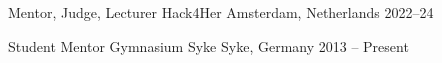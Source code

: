 
\begin{cvhonors}

  \cvhonor
    {Mentor, Judge, Lecturer} %
    {Hack4Her} %
    {Amsterdam, Netherlands} %
    {2022--24} %

  \cvhonor
    {Student Mentor} %
    {Gymnasium Syke} %
    {Syke, Germany} %
    {2013 -- Present} %

\end{cvhonors}
